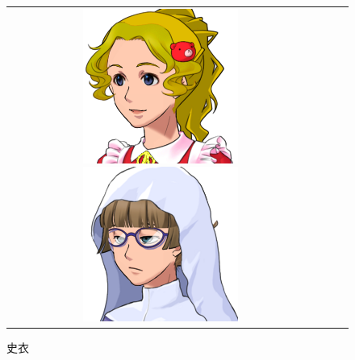 \begin{figure}[b]
\begin{tabular}{cccc}
\begin{minipage}{0.2\textwidth}\includegraphics[width=\textwidth]{./jumpakuasset/B.png}\caption{美衣}\label{fig:jumpakuB}\end{minipage}
\begin{minipage}{0.2\textwidth}\includegraphics[width=\textwidth]{./jumpakuasset/C.png}\caption{史衣}\label{fig:jumpakuC}\end{minipage}

\end{tabular}
\end{figure}
